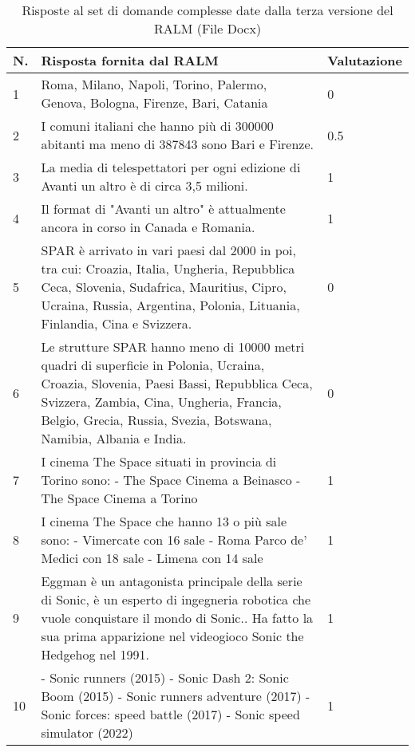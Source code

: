 \begin{table}[H]
    \centering
    \begin{tabular}{|p{0.5cm} |p{6cm} |p{2cm}|}
        \hline
        \textbf{N}. & \textbf{Risposta fornita dal RALM} & \textbf{Valutazione} \\
        \hline
        1 & Roma, Milano, Napoli, Torino, Palermo, Genova, Bologna, Firenze, Bari, Catania & 0 \\
        \hline
        2 & I comuni italiani che hanno più di 300000 abitanti ma meno di 387843 sono Bari e Firenze. & 0.5 \\
        \hline
        3 & La media di telespettatori per ogni edizione di Avanti un altro è di circa 3,5 milioni. & 1 \\
        \hline
        4 & Il format di "Avanti un altro" è attualmente ancora in corso in Canada e Romania. & 1 \\
        \hline
        5 & SPAR è arrivato in vari paesi dal 2000 in poi, tra cui: Croazia, Italia, Ungheria, Repubblica Ceca, Slovenia, Sudafrica, Mauritius, Cipro, Ucraina, Russia, Argentina, Polonia, Lituania, Finlandia, Cina e Svizzera. & 0 \\
        \hline
        6 & Le strutture SPAR hanno meno di 10000 metri quadri di superficie in Polonia, Ucraina, Croazia, Slovenia, Paesi Bassi, Repubblica Ceca, Svizzera, Zambia, Cina, Ungheria, Francia, Belgio, Grecia, Russia, Svezia, Botswana, Namibia, Albania e India. & 0 \\
        \hline
        7 & I cinema The Space situati in provincia di Torino sono: 
        - The Space Cinema a Beinasco
        - The Space Cinema a Torino & 1 \\
        \hline
        8 & I cinema The Space che hanno 13 o più sale sono:
        - Vimercate con 16 sale
        - Roma Parco de' Medici con 18 sale
        - Limena con 14 sale & 1 \\
        \hline
        9 & Eggman è un antagonista principale della serie di Sonic, è un esperto di ingegneria robotica che vuole conquistare il mondo di Sonic.. Ha fatto la sua prima apparizione nel videogioco Sonic the Hedgehog nel 1991. & 1 \\
        \hline
        10 & - Sonic runners (2015)
        - Sonic Dash 2: Sonic Boom (2015)
        - Sonic runners adventure (2017)
        - Sonic forces: speed battle (2017)
        - Sonic speed simulator (2022) & 1 \\
        \hline
    \end{tabular}
    \caption{Risposte al set di domande complesse date dalla terza versione del RALM (File Docx)}
\end{table}

